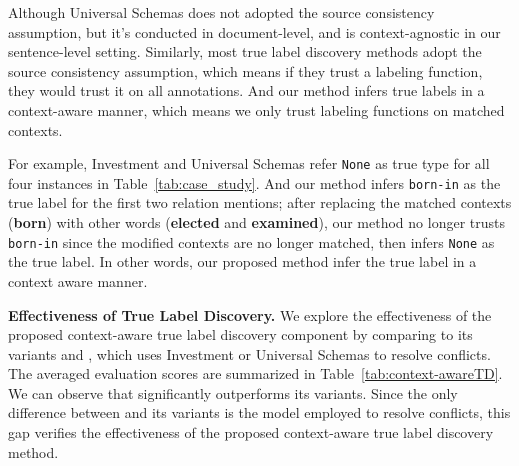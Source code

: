 Although Universal Schemas does not adopted the source consistency assumption, but it's conducted in document-level, and is context-agnostic in our sentence-level setting. Similarly, most true label discovery methods adopt the source consistency assumption, which means if they trust a labeling function, they would trust it on all annotations. And our method infers true labels in a context-aware manner, which means we only trust labeling functions on matched contexts.

For example, Investment and Universal Schemas refer \texttt{None} as true type for all four instances in Table~\ref{tab:case_study}. And our method infers \texttt{born-in} as the true label for the first two relation mentions; after replacing the matched contexts (\textbf{born}) with other words (\textbf{elected} and \textbf{examined}), our method no longer trusts \texttt{born-in} since the modified contexts are no longer matched, then infers \texttt{None} as the true label. In other words, our proposed method infer the true label in a context aware manner.

\smallskip
\noindent
\textsf{\small\textbf{Effectiveness of True Label Discovery. }} 
We explore the effectiveness of the proposed context-aware true label discovery component by comparing \our to its variants \ourtd and \ourus, which uses Investment or Universal Schemas to resolve conflicts. The averaged evaluation scores are summarized in Table~\ref{tab:context-awareTD}. 
We can observe that \our significantly outperforms its variants. 
Since the only difference between \our and its variants is the model employed to resolve conflicts, this gap verifies the effectiveness of the proposed context-aware true label discovery method.


